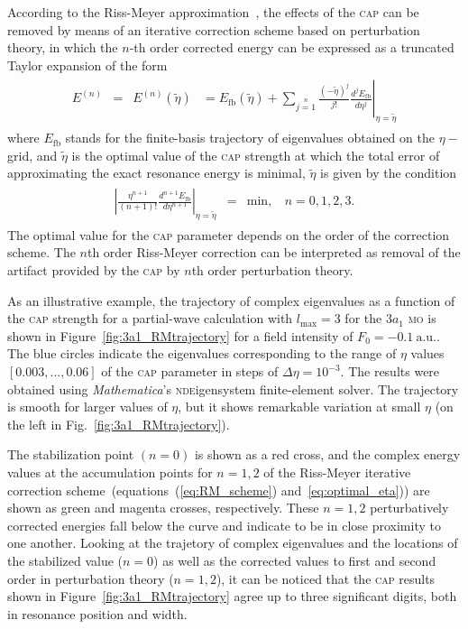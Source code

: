 According to the Riss-Meyer approximation~\cite{RissMeyer_1993}, the
effects of the \textsc{cap} can be removed by means of an iterative
correction scheme based on perturbation theory, in which the $n$-th
order corrected energy can be expressed as a truncated Taylor
expansion of the form
%
\begin{eqnarray}
  \begin{split}
    E^{(n)} & = & E^{(n)}(\tilde{\eta}) & =
    E_{\mathrm{fb}}(\tilde{\eta}) +
    \sum\limits_{j=1}\limits^{n}
    \left.
    \frac{(-\tilde{\eta})^{j}}{j!} \frac{d^{j}E_{\mathrm{fb}}}{d\eta^{j}}
    \right|_{\eta=\tilde{\eta}}
  \end{split}
  \label{eq:RM_scheme}
\end{eqnarray}
%
where $E_{\mathrm{fb}}$ stands for the finite-basis trajectory of
eigenvalues obtained on the $\eta-$grid, and $\tilde{\eta}$ is the
optimal value of the \textsc{cap} strength at which the total error of
approximating the exact resonance energy is minimal, $\tilde{\eta}$ is
given by the condition
%
\begin{eqnarray}
  \begin{split}
    \left| \frac{\eta^{n+1}}{(n + 1)!} \frac{d^{n+1} E_{\mathrm{fb}}}{d\eta^{n+1}}
    \right|_{\eta=\tilde{\eta}} & = & \mathrm{min}, ~~~~ n = 0,1,2,3.
  \end{split}
  \label{eq:optimal_eta}
\end{eqnarray}
%
The optimal value for the \textsc{cap} parameter depends on the order
of the correction scheme. The $n$th order Riss-Meyer correction can be
interpreted as removal of the artifact provided by the \textsc{cap} by
$n$th order perturbation theory.

As an illustrative example, the trajectory of complex eigenvalues as a
function of the \textsc{cap} strength for a partial-wave calculation
with $l_{\mathrm{max}}=3$ for the $3a_{1}$ \textsc{mo} is shown in
Figure~\ref{fig:3a1_RMtrajectory} for a field intensity of $F_{0} =
-0.1\ \mathrm{a.u.}$. The blue circles indicate the eigenvalues
corresponding to the range of $\eta$ values $[0.003, \dots, 0.06]$ of
the \textsc{cap} parameter in steps of $\Delta\eta = 10^{-3}$. The
results were obtained using \emph{Mathematica}'s
\textsc{nde}igensystem finite-element solver. The trajectory is smooth
for larger values of $\eta$, but it shows remarkable variation at
small $\eta$ (on the left in Fig.~\ref{fig:3a1_RMtrajectory}).

The stabilization point $(n = 0)$ is shown as a red cross, and the
complex energy values at the accumulation points for $n = 1, 2$ of the
Riss-Meyer iterative correction scheme~(equations~(\ref{eq:RM_scheme})
and~\ref{eq:optimal_eta})) are shown as green and magenta crosses,
respectively. These $n = 1, 2$ perturbatively corrected energies fall
below the curve and indicate to be in close proximity to one
another. Looking at the trajetory of complex eigenvalues and the
locations of the stabilized value ($n = 0$) as well as the corrected
values to first and second order in perturbation theory ($n = 1, 2$),
it can be noticed that the \textsc{cap} results shown in
Figure~\ref{fig:3a1_RMtrajectory} agree up to three significant
digits, both in resonance position and width.

